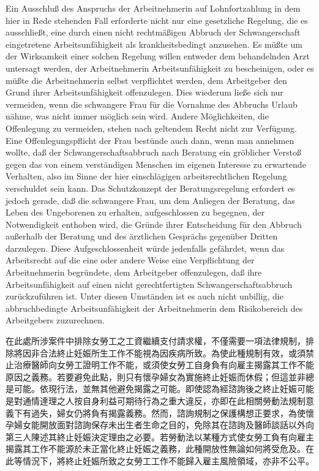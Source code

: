 \documentclass[12pt]{article}
\begin{document}
\begin{sourcepara}[title={原文E.227}]
Ein Ausschluß des Anspruchs der Arbeitnehmerin auf Lohnfortzahlung in dem hier in Rede stehenden Fall erforderte nicht nur eine gesetzliche Regelung, die es ausschließt, eine durch einen nicht rechtmäßigen Abbruch der Schwangerschaft eingetretene Arbeitsunfähigkeit als krankheitsbedingt anzusehen. Es müßte um der Wirksamkeit einer solchen Regelung willen entweder dem behandelnden Arzt untersagt werden, der Arbeitnehmerin Arbeitsunfähigkeit zu bescheinigen, oder es müßte die Arbeitnehmerin selbst verpflichtet werden, dem Arbeitgeber den Grund ihrer Arbeitsunfähigkeit offenzulegen. Dies wiederum ließe sich nur vermeiden, wenn die schwangere Frau für die Vornahme des Abbruchs Urlaub nähme, was nicht immer möglich sein wird. Andere Möglichkeiten, die Offenlegung zu vermeiden, stehen nach geltendem Recht nicht zur Verfügung. Eine Offenlegungspflicht der Frau bestünde auch dann, wenn man annehmen wollte, daß der Schwangerschaftsabbruch nach Beratung ein gröblicher Verstoß gegen das von einem verständigen Menschen im eigenen Interesse zu erwartende Verhalten, also im Sinne der hier einschlägigen arbeitsrechtlichen Regelung verschuldet sein kann. Das Schutzkonzept der Beratungsregelung erfordert es jedoch gerade, daß die schwangere Frau, um dem Anliegen der Beratung, das Leben des Ungeborenen zu erhalten, aufgeschlossen zu begegnen, der Notwendigkeit enthoben wird, die Gründe ihrer Entscheidung für den Abbruch außerhalb der Beratung und des ärztlichen Gesprächs gegenüber Dritten darzulegen. Diese Aufgeschlossenheit würde jedenfalls gefährdet, wenn das Arbeitsrecht auf die eine oder andere Weise eine Verpflichtung der Arbeitnehmerin begründete, dem Arbeitgeber offenzulegen, daß ihre Arbeitsunfähigkeit auf einen nicht gerechtfertigten Schwangerschaftsabbruch zurückzuführen ist. Unter diesen Umständen ist es auch nicht unbillig, die abbruchbedingte Arbeitsunfähigkeit der Arbeitnehmerin dem Risikobereich des Arbeitgebers zuzurechnen.
\end{sourcepara}
\begin{transpara}
在此處所涉案件中排除女勞工之工資繼續支付請求權，不僅需要一項法律規制，排除將因非合法終止妊娠所生工作不能視為因疾病所致。為使此種規制有效，或須禁止治療醫師向女勞工證明工作不能，或須使女勞工自身負有向雇主揭露其工作不能原因之義務。若要避免此點，則只有懷孕婦女為實施終止妊娠而休假；但這並非總是可能。依現行法，並無其他避免揭露之可能。即使認為經諮詢後之終止妊娠可能是對通情達理之人按自身利益可期待行為之重大違反，亦即在此相關勞動法規制意義下有過失，婦女仍將負有揭露義務。然而，諮詢規制之保護構想正要求，為使懷孕婦女能開放面對諮詢保存未出生者生命之目的，免除其在諮詢及醫師談話以外向第三人陳述其終止妊娠決定理由之必要。若勞動法以某種方式使女勞工負有向雇主揭露其工作不能源於未正當化終止妊娠之義務，此種開放性無論如何將受危及。在此等情況下，將終止妊娠所致之女勞工工作不能歸入雇主風險領域，亦非不公平。
\end{transpara}
\end{document}
